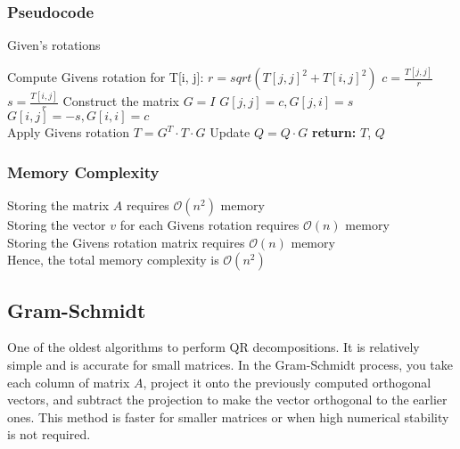 \documentclass[final]{article}
\begin{document}
            \subsubsection{Pseudocode}
            \begin{algorithm}
                \caption{Given's rotations}
                \begin{algorithmic}
                            \State Compute Givens rotation for T[i, j]:
                            \State $r = sqrt(T[j,j]^{2} + T[i, j]^2)$
                            \State $ c = \frac{T[j, j]}{r}$
                            \State $s = \frac{T[i, j]}{r}$
                            \State Construct the matrix
                            \State $G=I$
                            \State    $G[j, j] = c, G[j, i] = s$ \\ 
                                      $G[i, j] = -s, G[i, i] = c$ \\
                            \State Apply Givens rotation
                            \State $ T = G^T \cdot T \cdot G$
                            \State Update $Q = Q\cdot G$
                        \EndFor
                    \EndFor
                    \State \textbf{return:} $T$, $Q$
                \end{algorithmic}
            \end{algorithm}
            \subsubsection{Memory Complexity}
                Storing the matrix $ A $ requires $ \mathcal{O}(n^2) $ memory \\
Storing the vector $ v $ for each Givens rotation requires $ \mathcal{O}(n) $ memory \\
Storing the Givens rotation matrix requires $ \mathcal{O}(n) $ memory \\
Hence, the total memory complexity is $ \mathcal{O}(n^2) $

        \subsection{Gram-Schmidt} 
            One of the oldest algorithms to perform QR decompositions. It is relatively simple and is accurate for small matrices. In the Gram-Schmidt process, you take each column of matrix 
$A$, project it onto the previously computed orthogonal vectors, and subtract the projection to make the vector orthogonal to the earlier ones. This method is faster for smaller matrices or when high numerical stability is not required. 
\end{document}
